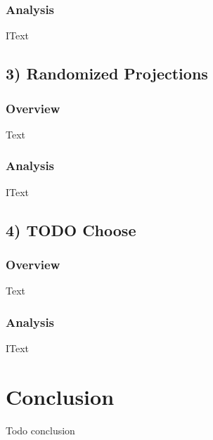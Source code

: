 \documentclass[h]{article}
\begin{document}
\subsubsection*{Analysis}
IText

\subsection*{3) Randomized Projections}  
\subsubsection*{Overview}
Text

\subsubsection*{Analysis}
IText

\subsection*{4) TODO Choose}  
\subsubsection*{Overview}
Text

\subsubsection*{Analysis}
IText


\section*{Conclusion}  
Todo conclusion
\end{document}
